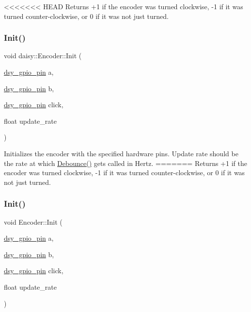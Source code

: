<<<<<<< HEAD
Returns +1 if the encoder was turned clockwise, -\/1 if it was turned counter-\/clockwise, or 0 if it was not just turned. \mbox{\label{classdaisy_1_1_encoder_ac4c797dfe737427064fb64ceeb28be80}} 
\subsubsection{\texorpdfstring{Init()}{Init()}}
{\footnotesize\ttfamily void daisy\+::\+Encoder\+::\+Init (\begin{DoxyParamCaption}\item[{\hyperlink{structdsy__gpio__pin}{dsy\+\_\+gpio\+\_\+pin}}]{a,  }\item[{\hyperlink{structdsy__gpio__pin}{dsy\+\_\+gpio\+\_\+pin}}]{b,  }\item[{\hyperlink{structdsy__gpio__pin}{dsy\+\_\+gpio\+\_\+pin}}]{click,  }\item[{float}]{update\+\_\+rate }\end{DoxyParamCaption})}

Initializes the encoder with the specified hardware pins. Update rate should be the rate at which \hyperlink{classdaisy_1_1_encoder_a5bed96517dbffee1fb16255ec9faa7e7}{Debounce()} gets called in Hertz. \mbox{\label{classdaisy_1_1_encoder_a7c3a633c4e578dac0bdf5829b9bed99f}} 
=======
Returns +1 if the encoder was turned clockwise, -\/1 if it was turned counter-\/clockwise, or 0 if it was not just turned. \mbox{\label{classdaisy_1_1_encoder_aa594d3ec06e1582d85c82d5b7e4972dd}} 
\subsubsection{\texorpdfstring{Init()}{Init()}}
{\footnotesize\ttfamily void Encoder\+::\+Init (\begin{DoxyParamCaption}\item[{\hyperlink{structdsy__gpio__pin}{dsy\+\_\+gpio\+\_\+pin}}]{a,  }\item[{\hyperlink{structdsy__gpio__pin}{dsy\+\_\+gpio\+\_\+pin}}]{b,  }\item[{\hyperlink{structdsy__gpio__pin}{dsy\+\_\+gpio\+\_\+pin}}]{click,  }\item[{float}]{update\+\_\+rate }\end{DoxyParamCaption})}

